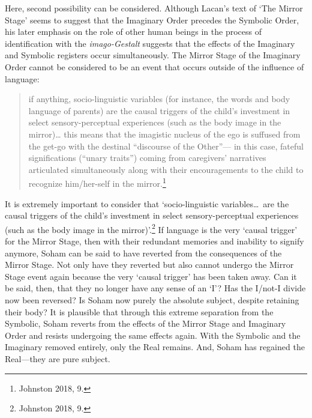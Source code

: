 Here, second possibility can be considered. Although Lacan's text of
`The Mirror Stage' seems to suggest that the Imaginary Order precedes
the Symbolic Order, his later emphasis on the role of other human beings
in the process of identification with the \emph{imago-Gestalt} suggests
that the effects of the Imaginary and Symbolic registers occur
simultaneously. The Mirror Stage of the Imaginary Order cannot be
considered to be an event that occurs outside of the influence of
language:
\begin{quote}
if anything, socio-linguistic variables (for instance, the words and
body language of parents) are the causal triggers of the child's
investment in select sensory-perceptual experiences (such as the body
image in the mirror)\ldots{} this means that the imagistic nucleus of
the ego is suffused from the get-go with the destinal ``discourse of the
Other''--- in this case, fateful significations (``unary traits'')
coming from caregivers' narratives articulated simultaneously along with
their encouragements to the child to recognize him/her-self in the
mirror.\footnote{Johnston 2018, 9.}
\end{quote}
It is extremely important to consider that `socio-linguistic
variables\ldots\ are the causal triggers of the child's investment in
select sensory-perceptual experiences (such as the body image in the
mirror)'.\footnote{Johnston 2018, 9.} If language is the very `causal trigger'
for the Mirror Stage, then with their redundant memories and inability
to signify anymore, Soham can be said to have reverted from the
consequences of the Mirror Stage. Not only have they reverted but also
cannot undergo the Mirror Stage event again because the very `causal
trigger' has been taken away. Can it be said, then, that they no longer
have any sense of an `I'? Has the I/not-I divide now been reversed? Is
Soham now purely the absolute subject, despite retaining their body? It
is plausible that through this extreme separation from the Symbolic,
Soham reverts from the effects of the Mirror Stage and Imaginary Order
and resists undergoing the same effects again. With the Symbolic and the
Imaginary removed entirely, only the Real remains. And, Soham has
regained the Real---they are pure subject.

